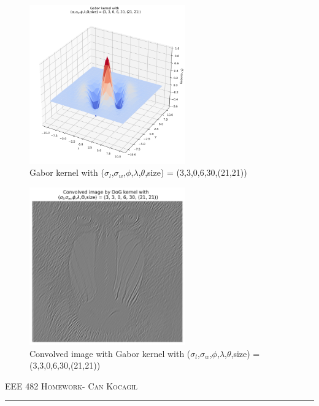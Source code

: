 \documentclass[12pt]{amsart}
\begin{document}
\begin{figure}[ht]
    \centering
    \includegraphics[width = 0.6\textwidth]{images/Gabor_30_3d.png}
    \caption{Gabor kernel with ($\sigma_l$,$\sigma_w$,$\phi$,$\lambda$,$\theta$,size) = (3,3,0,6,30,(21,21))}
\end{figure}


\begin{figure}[ht]
    \centering
    \includegraphics[width = 0.6\textwidth]{images/Gabor_conv_30.png}
    \caption{Convolved image with Gabor kernel with ($\sigma_l$,$\sigma_w$,$\phi$,$\lambda$,$\theta$,size) = (3,3,0,6,30,(21,21))}
\end{figure}



\newpage
{\scshape EEE 482} \hfill {\scshape \large  Homework-\relax} \hfill {\scshape Can Kocagil}
\smallskip
\hrule
\vspace{2mm}
\end{document}
